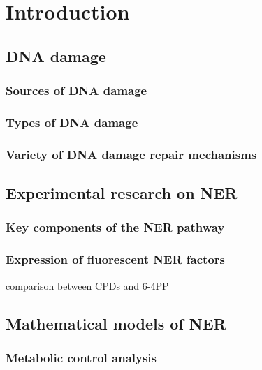 \chapter{Introduction}
\pagestyle{plain}
%
%
\section{DNA damage}

\subsection{Sources of DNA damage}

\subsection{Types of DNA damage}

\subsection{Variety of DNA damage repair mechanisms}

\section{Experimental research on NER}
\label{sec:NERexperiments}
\subsection{Key components of the NER pathway}
\subsection{Expression of fluorescent NER factors}
comparison between CPDs and 6-4PP
\section{Mathematical models of NER}
\subsection{Metabolic control analysis}
